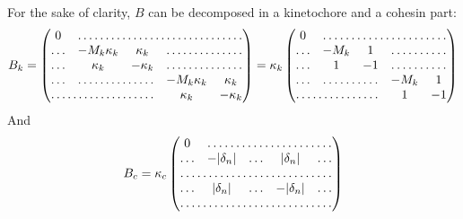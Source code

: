 \documentclass[a4paper,12pt]{article}
\begin{document}
For the sake of clarity, $B$ can be decomposed in a kinetochore and a
cohesin part:
\begin{equation}
  B_k =%
  \begin{pmatrix}
    \,0\, & \hdotsfor{4}\\
    \hdots &  - M_k \kappa_k & \kappa_k & \hdotsfor{2} \\
    \hdots & \kappa_k & -\kappa_k &  \hdotsfor{2}\\
    \hdots &  \hdotsfor{2} & - M_k \kappa_k & \kappa_k \\
    \hdotsfor{3}  & \kappa_k & - \kappa_k\\
  \end{pmatrix}
  =\kappa_k%
  \begin{pmatrix}
    \,0\, & \hdotsfor{4}\\
    \hdots &  - M_k  & 1 & \hdotsfor{2} \\
    \hdots & 1 & -1 &  \hdotsfor{2}\\
    \hdots &  \hdotsfor{2} & - M_k  & 1 \\
    \hdotsfor{3}  & 1 & - 1\\
  \end{pmatrix}
\end{equation}
And
\begin{equation}
  B_c =\kappa_c%
  \begin{pmatrix}
    \,0\, & \hdotsfor{4}\\
    \hdots & - |\delta_n| & \hdots & |\delta_n| & \hdots \\
    \hdotsfor{5}\\
    \hdots & |\delta_n| & \hdots & -|\delta_n|& \hdots \\
    \hdotsfor{5}\\
  \end{pmatrix}
\end{equation}


\end{document}
